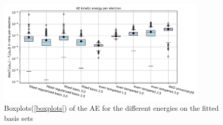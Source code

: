 \begin{figure}
    \includegraphics[width=0.9\textwidth]{chapters/results/results_images/AE_kin_energy_on_hartree+external_MOFDFT_for_different_basis_sets}
    \caption{Boxplots(\ref{boxplots}) of the AE for the different energies on the fitted basis sets}
\end{figure}
